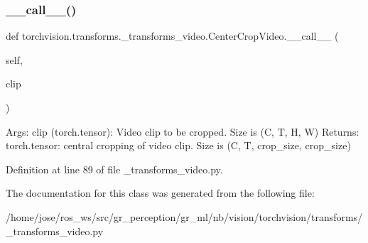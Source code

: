 \subsubsection{\texorpdfstring{\+\_\+\+\_\+call\+\_\+\+\_\+()}{\_\_call\_\_()}}
{\footnotesize\ttfamily def torchvision.\+transforms.\+\_\+transforms\+\_\+video.\+Center\+Crop\+Video.\+\_\+\+\_\+call\+\_\+\+\_\+ (\begin{DoxyParamCaption}\item[{}]{self,  }\item[{}]{clip }\end{DoxyParamCaption})}

\begin{DoxyVerb}Args:
    clip (torch.tensor): Video clip to be cropped. Size is (C, T, H, W)
Returns:
    torch.tensor: central cropping of video clip. Size is
    (C, T, crop_size, crop_size)
\end{DoxyVerb}
 

Definition at line 89 of file \+\_\+transforms\+\_\+video.\+py.



The documentation for this class was generated from the following file\+:\begin{DoxyCompactItemize}
\item 
/home/jose/ros\+\_\+ws/src/gr\+\_\+perception/gr\+\_\+ml/nb/vision/torchvision/transforms/\+\_\+transforms\+\_\+video.\+py\end{DoxyCompactItemize}
